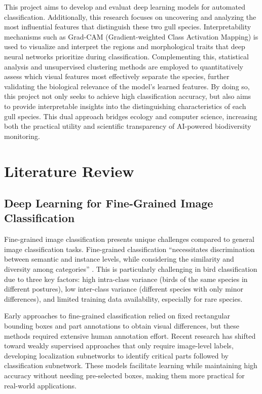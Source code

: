 \documentclass[a4paper,12pt]{report}
\begin{document}
This project aims to develop and evaluat deep learning models for automated classification. Additionally, this research focuses on uncovering and analyzing the most influential features that distinguish these two gull species. Interpretability mechanisms such as Grad-CAM (Gradient-weighted Class Activation Mapping) is used to visualize and interpret the regions and morphological traits that deep neural networks prioritize during classification. Complementing this, statistical analysis and unsupervised clustering methods are employed to quantitatively assess which visual features most effectively separate the species, further validating the biological relevance of the model’s learned features. By doing so, this project not only seeks to achieve high classification accuracy, but also aims to provide interpretable insights into the distinguishing characteristics of each gull species. This dual approach bridges ecology and computer science, increasing both the practical utility and scientific transparency of AI-powered biodiversity monitoring.

\newpage
\chapter{Literature Review}
\section*{Deep Learning for Fine-Grained Image Classification}
Fine-grained image classification presents unique challenges compared to general image classification tasks. Fine-grained classification \enquote{necessitates discrimination between semantic and instance levels, while considering the similarity and diversity among categories} \citep{source2}. This is particularly challenging in bird classification due to three key factors: high intra-class variance (birds of the same species in different postures), low inter-class variance (different species with only minor differences), and limited training data availability, especially for rare species\citep{source2}.

Early approaches to fine-grained classification relied on fixed rectangular bounding boxes and part annotations to obtain visual differences, but these methods required extensive human annotation effort. Recent research has shifted toward weakly supervised approaches that only require image-level labels, developing localization subnetworks to identify critical parts followed by classification subnetwork. \citep{source2} These models facilitate learning while maintaining high accuracy without needing pre-selected boxes, making them more practical for real-world applications.
\end{document}
